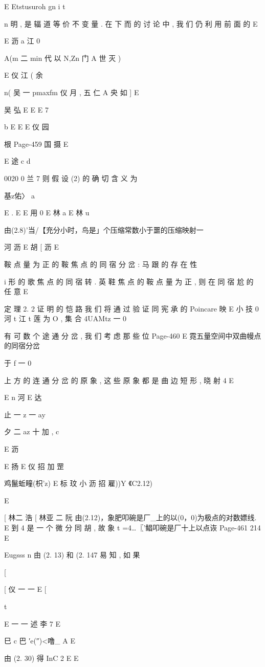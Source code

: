 {{{{{E
Etstusuroh gn i
t

n
明 , 是 辐 道 等 价 不 变 量 . 在 下 而 的 讨 论 中 , 我 们 仍 利 用 前 面 的
E

E 沥 a 江 0

A(m 二 min 代 以 N,Zn 门 A 世 灭 )

E 仪 江 ( 余

n( 吴 一 pmaxfm 仪 月 , 五 仁 A 央 如 ]
E

吴 弘
E E E 7

b
E
E
E 仪
园

根
Page-459
国 摄 E

E 途 c
d

0020 0 兰 7
则 假 设 (2) 的 确 切 含 义 为

基z佑〉 a

E .
E
E 用
0
E 林 a
E 林
u

由(2.8)'当/【充分小时，鸟是」个压缩常数小于噩的压缩映射一

河 沥
E 胡 [ 沥
E

鞍 点 量 为 正 的 鞍 焦 点 的 同 宿 分 岔 : 马 跟 的 存 在 性

i
形 的 歌 焦 点 的 同 宿 转 . 英 鞋 焦 点 的 鞍 点 量 为 正 , 则 在 同 宿 尬 的 任 意
E

定 理 2. 2 证 明 的 恺 路 我 们 将 通 过 验 证 同 宪 承 的 Poincare 映
E 小 技
0
河
t 江 t 莲
为 O , 集 合 4UAMtz 一 0} 有 可 数 个 途 通 分 岔 , 我 们 考 虑 那 些 位
Page-460
E 霓五量空间中双曲幔点的同宿分岔

于 f 一 0} 上 方 的 连 通 分 岔 的 原 象 , 这 些 原 象 都 是 曲 边 短 形 , 晓 射 4
E

E
n 河
E 达

止 一 z 一 ay
{夕 二 az 十 加 ,
c

E 沥

E 扬
E 仪 招 加 罡

鸡鬣蚯疃(枳'z) E 标 玟 小 沥 招 雇))Y 《C2.12)

E

[ 林二 浩 [ 林亚 二 阮
由(2.12)，象肥叩碗是厂_上的以(0，0)为极点的对数嫖线. E
到 4 是 一 个 微 分 同 胡 , 故 象 t =4…〖'鲳叩碗是厂十上以点诙
Page-461
214 E

Eugsss
n
由 (2. 13) 和 (2. 147 易 知 , 如 果

[

[ 仪 一 一
E
[

t

E 一 一 述
李 7
E

巳 c 巴
′e(″)<噜_ A E

由 (2. 30) 得
InC 2 E
E

}}}}
